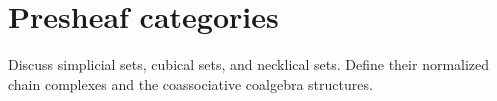
\section{Presheaf categories}

Discuss simplicial sets, cubical sets, and necklical sets. Define their normalized chain complexes and the coassociative coalgebra structures.



%
